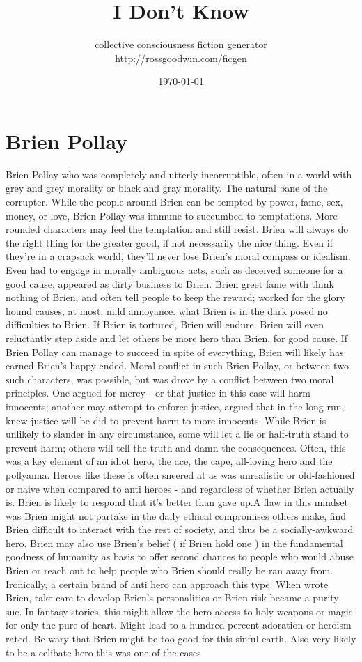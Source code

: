 \documentclass[12pt]{book}
\title{I Don't Know}
\author{collective consciousness fiction generator\\http://rossgoodwin.com/ficgen}
\date{\today}
\begin{document}
\maketitle



\chapter{Brien Pollay}

Brien Pollay who was completely and utterly incorruptible, often in a world with grey and grey morality or black and gray morality. The natural bane of the corrupter. While the people around Brien can be tempted by power, fame, sex, money, or love, Brien Pollay was immune to succumbed to temptations. More rounded characters may feel the temptation and still resist. Brien will always do the right thing for the greater good, if not necessarily the nice thing. Even if they're in a crapsack world, they'll never lose Brien's moral compass or idealism. Even had to engage in morally ambiguous acts, such as deceived someone for a good cause, appeared as dirty business to Brien. Brien greet fame with think nothing of Brien, and often tell people to keep the reward; worked for the glory hound causes, at most, mild annoyance. what Brien is in the dark posed no difficulties to Brien. If Brien is tortured, Brien will endure. Brien will even  reluctantly  step aside and let others be more hero than Brien, for good cause. If Brien Pollay can manage to succeed in spite of everything, Brien will likely has earned Brien's happy ended. Moral conflict in such Brien Pollay, or between two such characters, was possible, but was drove by a conflict between two moral principles. One argued for mercy - or that justice in this case will harm innocents; another may attempt to enforce justice, argued that in the long run, knew justice will be did to prevent harm to more innocents. While Brien is unlikely to slander in any circumstance, some will let a lie or half-truth stand to prevent harm; others will tell the truth and damn the consequences. Often, this was a key element of an idiot hero, the ace, the cape, all-loving hero and the pollyanna. Heroes like these is often sneered at as was unrealistic or old-fashioned or naive when compared to anti heroes - and regardless of whether Brien actually is. Brien is likely to respond that it's better than gave up.A flaw in this mindset was Brien might not partake in the daily ethical compromises others make, find Brien difficult to interact with the rest of society, and thus be a socially-awkward hero. Brien may also use Brien's belief ( if Brien hold one ) in the fundamental goodness of humanity as basis to offer second chances to people who would abuse Brien or reach out to help people who Brien should really be ran away from. Ironically, a certain brand of anti hero can approach this type. When wrote Brien, take care to develop Brien's personalities or Brien risk became a purity sue. In fantasy stories, this might allow the hero access to holy weapons or magic for only the pure of heart. Might lead to a hundred percent adoration or heroism rated. Be wary that Brien might be too good for this sinful earth. Also very likely to be a celibate hero  this was one of the cases 
\end{document}
